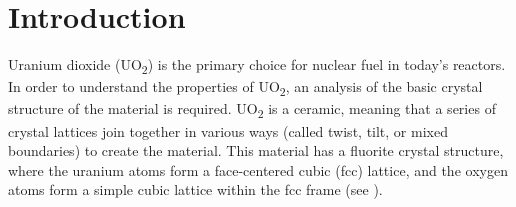 \documentclass[twoside,senior]{BYUPhys}
\begin{document}
 \frontmatter

 \makepreliminarypages

 \singlespace

 \tableofcontents
 \clearemptydoublepage

 \listoffigures
 \clearemptydoublepage

 \doublespace

 \mainmatter


\chapter{Introduction\label{intro}}


Uranium dioxide (UO\textsubscript{2}) is the primary choice for nuclear fuel in today's reactors.\cite{uraniumInfo}  In order to understand the properties of UO\textsubscript{2}, an analysis of the basic crystal structure of the material is required.  UO\textsubscript{2} is a ceramic, meaning that a series of crystal lattices join together in various ways (called twist, tilt, or mixed boundaries) to create the material.  This material has a fluorite crystal structure, where the uranium atoms form a face-centered cubic (fcc) lattice, and the oxygen atoms form a simple cubic lattice within the fcc frame (see ).
\end{document}
